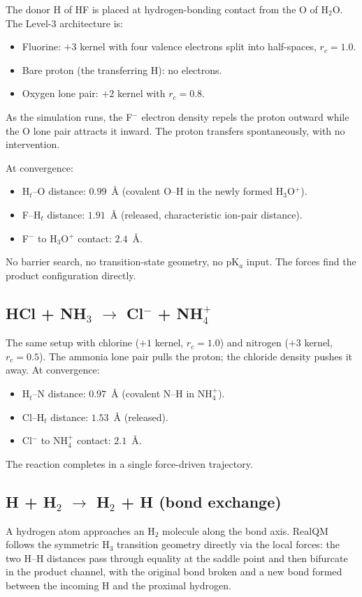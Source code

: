 The donor H of HF is placed at hydrogen-bonding contact from the O of H$_2$O. The Level-3 architecture is:
\begin{itemize}
\item Fluorine: $+3$ kernel with four valence electrons split into half-spaces, $r_c = 1.0$.
\item Bare proton (the transferring H): no electrons.
\item Oxygen lone pair: $+2$ kernel with $r_c = 0.8$.
\end{itemize}
As the simulation runs, the F$^-$ electron density repels the proton outward while the O lone pair attracts it inward. The proton transfers spontaneously, with no intervention.

At convergence:
\begin{itemize}
\item H$_t$--O distance: $0.99$~\AA{} (covalent O--H in the newly formed H$_3$O$^+$).
\item F--H$_t$ distance: $1.91$~\AA{} (released, characteristic ion-pair distance).
\item F$^-$ to H$_3$O$^+$ contact: $2.4$~\AA.
\end{itemize}
No barrier search, no transition-state geometry, no pK$_a$ input. The forces find the product configuration directly.

\subsection{HCl + NH$_3$ $\to$ Cl$^-$ + NH$_4^+$}

The same setup with chlorine ($+1$ kernel, $r_c = 1.0$) and nitrogen ($+3$ kernel, $r_c = 0.5$). The ammonia lone pair pulls the proton; the chloride density pushes it away. At convergence:
\begin{itemize}
\item H$_t$--N distance: $0.97$~\AA{} (covalent N--H in NH$_4^+$).
\item Cl--H$_t$ distance: $1.53$~\AA{} (released).
\item Cl$^-$ to NH$_4^+$ contact: $2.1$~\AA.
\end{itemize}
The reaction completes in a single force-driven trajectory.

\subsection{H + H$_2$ $\to$ H$_2$ + H (bond exchange)}

A hydrogen atom approaches an H$_2$ molecule along the bond axis. RealQM follows the symmetric H$_3$ transition geometry directly via the local forces: the two H--H distances pass through equality at the saddle point and then bifurcate in the product channel, with the original bond broken and a new bond formed between the incoming H and the proximal hydrogen.

